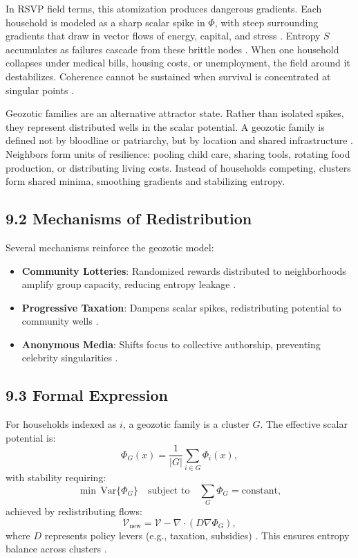 \documentclass[12pt]{article}
\begin{document}
{{In RSVP field terms, this atomization produces dangerous gradients. Each household is modeled as a sharp scalar spike in \(\Phi\), with steep surrounding gradients that draw in vector flows of energy, capital, and stress \citep{gromov1999}. Entropy \(S\) accumulates as failures cascade from these brittle nodes \citep{shannon1948}. When one household collapses under medical bills, housing costs, or unemployment, the field around it destabilizes. Coherence cannot be sustained when survival is concentrated at singular points \citep{jaynes2003}.

Geozotic families are an alternative attractor state. Rather than isolated spikes, they represent distributed wells in the scalar potential. A geozotic family is defined not by bloodline or patriarchy, but by location and shared infrastructure \citep{deleuze1987}. Neighbors form units of resilience: pooling child care, sharing tools, rotating food production, or distributing living costs. Instead of households competing, clusters form shared minima, smoothing gradients and stabilizing entropy.

\subsection*{9.2 Mechanisms of Redistribution}

Several mechanisms reinforce the geozotic model:
\begin{itemize}
    \item \textbf{Community Lotteries}: Randomized rewards distributed to neighborhoods amplify group capacity, reducing entropy leakage \citep{hanson2003}.
    \item \textbf{Progressive Taxation}: Dampens scalar spikes, redistributing potential to community wells \citep{zuboff2019}.
    \item \textbf{Anonymous Media}: Shifts focus to collective authorship, preventing celebrity singularities \citep{lanier2018}.
\end{itemize}

\subsection*{9.3 Formal Expression}

For households indexed as \(i\), a geozotic family is a cluster \(G\). The effective scalar potential is:
\[
\Phi_G(x) = \frac{1}{|G|} \sum_{i \in G} \Phi_i(x),
\]
with stability requiring:
\[
\min \, \mathrm{Var}\{\Phi_G\} \quad \text{subject to} \quad \sum_G \Phi_G = \text{constant},
\]
achieved by redistributing flows:
\[
\mathcal{V}_{\text{new}} = \mathcal{V} - \nabla \cdot (D \nabla \Phi_G),
\]
where \(D\) represents policy levers (e.g., taxation, subsidies) \citep{gromov1999}. This ensures entropy balance across clusters \citep{cover2006}.

}}
\end{document}
